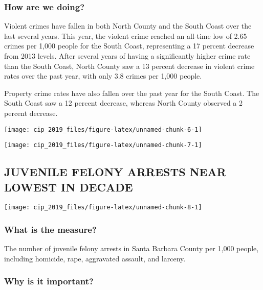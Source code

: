 \documentclass[]{book}
\theoremstyle{definition}
\theoremstyle{definition}
\theoremstyle{definition}
\theoremstyle{remark}
\begin{document}
\subsubsection*{How are we doing?}\label{how-are-we-doing-1}

Violent crimes have fallen in both North County and the South Coast over
the last several years. This year, the violent crime reached an all-time
low of 2.65 crimes per 1,000 people for the South Coast, representing a
17 percent decrease from 2013 levels. After several years of having a
significantly higher crime rate than the South Coast, North County saw a
13 percent decrease in violent crime rates over the past year, with only
3.8 crimes per 1,000 people.

Property crime rates have also fallen over the past year for the South
Coast. The South Coast saw a 12 percent decrease, whereas North County
observed a 2 percent decrease.

\texttt{[image: cip\_2019\_files/figure-latex/unnamed-chunk-6-1]}

\texttt{[image: cip\_2019\_files/figure-latex/unnamed-chunk-7-1]}

\subsection*{JUVENILE FELONY ARRESTS NEAR LOWEST IN
DECADE}\label{juvenile-felony-arrests-near-lowest-in-decade}

\texttt{[image: cip\_2019\_files/figure-latex/unnamed-chunk-8-1]}

\subsubsection*{What is the measure?}\label{what-is-the-measure}

The number of juvenile felony arrests in Santa Barbara County per 1,000
people, including homicide, rape, aggravated assault, and larceny.

\subsubsection*{Why is it important?}\label{why-is-it-important}
\end{document}
